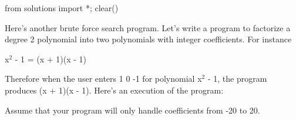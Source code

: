 \begin{python0}
from solutions import *; clear()
\end{python0}

Here's another brute force search program.
Let's write a program to factorize a degree 2 polynomial
into two polynomials with integer coefficients. For instance
\begin{center}
x$^2$ - 1 = (x + 1)(x - 1)
\end{center}
Therefore when the user enters 1 0 -1 for polynomial
x$^2$ - 1, the program produces (x + 1)(x - 1).
Here's an execution of the program:
Assume that your program will only handle coefficients from -20 to 20.

